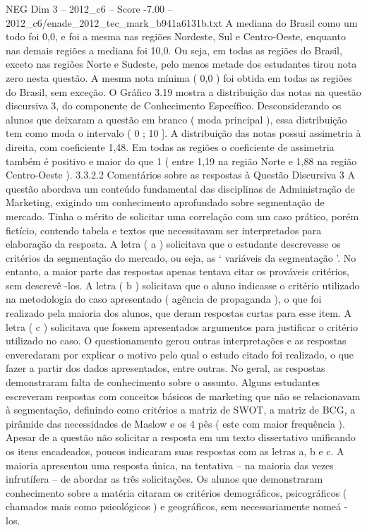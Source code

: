 \begin{textsample}{NEG Dim 3 – 2012\_c6 – Score -7.00 – 2012\_c6/enade\_2012\_tec\_mark\_b941a6131b.txt}
A mediana do Brasil como um todo foi 0,0, e foi a mesma nas regiões Nordeste, Sul e Centro-Oeste, enquanto nas demais regiões a mediana foi 10,0.
Ou seja, em todas as regiões do Brasil, exceto nas regiões Norte e Sudeste, pelo menos metade dos estudantes tirou nota zero nesta questão.
A mesma nota mínima ( 0,0 ) foi obtida em todas as regiões do Brasil, sem exceção.
O Gráfico 3.19 mostra a distribuição das notas na questão discursiva 3, do componente de Conhecimento Específico.
Desconsiderando os alunos que deixaram a questão em branco ( moda principal ), essa distribuição tem como moda o intervalo ( 0 ; 10 ].
A distribuição das notas possui assimetria à direita, com coeficiente 1,48.
Em todas as regiões o coeficiente de assimetria também é positivo e maior do que 1 ( entre 1,19 na região Norte e 1,88 na região Centro-Oeste ). 3.3.2.2 Comentários sobre as respostas à Questão Discursiva 3 A questão abordava um conteúdo fundamental das disciplinas de Administração de Marketing, exigindo um conhecimento aprofundado sobre segmentação de mercado.
Tinha o mérito de solicitar uma correlação com um caso prático, porém fictício, contendo tabela e textos que necessitavam ser interpretados para elaboração da resposta.
A letra ( a ) solicitava que o estudante descrevesse os critérios da segmentação do mercado, ou seja, as ‘ variáveis da segmentação ’.
No entanto, a maior parte das respostas apenas tentava citar os prováveis critérios, sem descrevê -los.
A letra ( b ) solicitava que o aluno indicasse o critério utilizado na metodologia do caso apresentado ( agência de propaganda ), o que foi realizado pela maioria dos alunos, que deram respostas curtas para esse item.
A letra ( c ) solicitava que fossem apresentados argumentos para justificar o critério utilizado no caso.
O questionamento gerou outras interpretações e as respostas enveredaram por explicar o motivo pelo qual o estudo citado foi realizado, o que fazer a partir dos dados apresentados, entre outras.
No geral, as respostas demonstraram falta de conhecimento sobre o assunto.
Alguns estudantes escreveram respostas com conceitos básicos de marketing que não se relacionavam à segmentação, definindo como critérios a matriz de SWOT, a matriz de BCG, a pirâmide das necessidades de Maslow e os 4 pês ( este com maior frequência ).
Apesar de a questão não solicitar a resposta em um texto dissertativo unificando os itens encadeados, poucos indicaram suas respostas com as letras a, b e c.
A maioria apresentou uma resposta única, na tentativa – na maioria das vezes infrutífera – de abordar as três solicitações.
Os alunos que demonstraram conhecimento sobre a matéria citaram os critérios demográficos, psicográficos ( chamados mais como psicológicos ) e geográficos, sem necessariamente nomeá -los.

\end{textsample}
